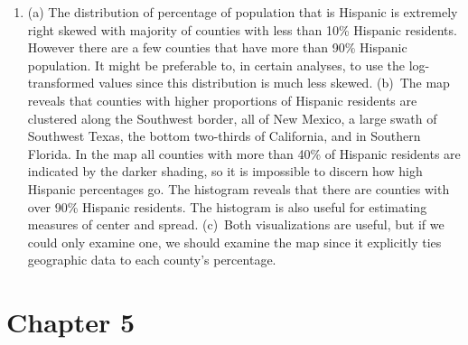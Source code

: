 \documentclass[
  10pt,
  openany]{book}
\begin{document}
\begin{enumerate}
  \addtocounter{enumi}{1}
\item
  (a) The distribution of percentage of population that is Hispanic is extremely right skewed with majority of counties with less than 10\% Hispanic residents. However there are a few counties that have more than 90\% Hispanic population. It might be preferable to, in certain analyses, to use the log-transformed values since this distribution is much less skewed. (b)~The map reveals that counties with higher proportions of Hispanic residents are clustered along the Southwest border, all of New Mexico, a large swath of Southwest Texas, the bottom two-thirds of California, and in Southern Florida. In the map all counties with more than 40\% of Hispanic residents are indicated by the darker shading, so it is impossible to discern how high Hispanic percentages go. The histogram reveals that there are counties with over 90\% Hispanic residents. The histogram is also useful for estimating measures of center and spread. (c)~Both visualizations are useful, but if we could only examine one, we should examine the map since it explicitly ties geographic data to each county's percentage.

  \addtocounter{enumi}{1}
\end{enumerate}

\hypertarget{exercise-solutions-07}{%
\section{Chapter 5}\label{exercise-solutions-07}}
\end{document}
